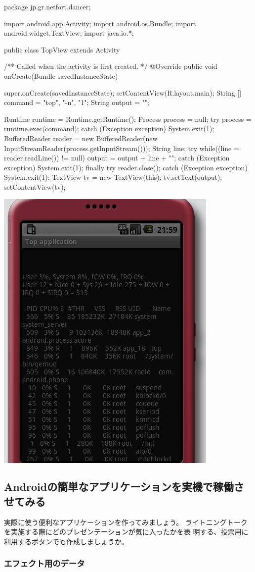 \documentclass[mingoth,a4paper]{jsarticle}
\begin{document}
\begin{commandline}
\begin{commandline}
package jp.gr.netfort.dancer;

import android.app.Activity;
import android.os.Bundle;
import android.widget.TextView;
import java.io.*;

public class TopView extends Activity {
	/** Called when the activity is first created. */
	@Override
	public void onCreate(Bundle savedInstanceState) {
		super.onCreate(savedInstanceState);
		setContentView(R.layout.main);
		String [] command = { "top", "-n", "1"};
		String output = "";

		Runtime runtime = Runtime.getRuntime();
		Process process = null;
		try { 
			process = runtime.exec(command);
		} catch (Exception exception){
			System.exit(1);
		}
		BufferedReader reader = new BufferedReader(new InputStreamReader(process.getInputStream()));
		String line;
		try {
			while((line = reader.readLine()) != null) {
				output = output + line + "\n";
			}
		} catch (Exception exception) {
			System.exit(1);
		} finally {
			try {
				reader.close();
			} catch (Exception exception) {
				System.exit(1);
			}
		}
		TextView tv = new TextView(this);
		tv.setText(output);
		setContentView(tv);
	}
} 
\end{commandline}

\includegraphics[width=0.3\hsize]{image200905/android-top.png}

\subsection{Androidの簡単なアプリケーションを実機で稼働させてみる}

実際に使う便利なアプリケーションを作ってみましょう。
ライトニングトークを実施する際にどのプレゼンテーションが気に入ったかを表
明する、投票用に利用するボタンでも作成しましょうか。

\subsubsection{エフェクト用のデータ}


\end{commandline}
\end{document}
